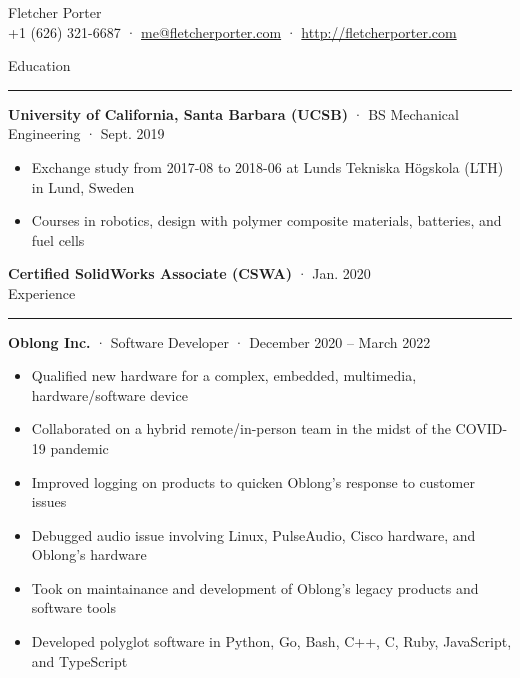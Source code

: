 \documentclass[12pt, oneside]{article}
\newcommand{\titlestyle}[1] {
	{\fontsize{40pt}{1em}\selectfont \textcolor{new_red}{\textsf{#1}}} \\
}
\newcommand{\headingstyleJobs}[1] {
	{\fontsize{18pt}{1em}\selectfont \textcolor{new_red}{\textsf{#1}}}
	\textcolor{new_red}{\rule{3.25in}{0.5pt}} \vspace{3pt}
}
\newcommand{\infostyle}[1] {
	{\selectfont #1} \\ \vspace{10pt}
}
\newcommand{\jobtitle}[3] {
	{\bf #1} · {#2} · {#3} \vspace{-7pt} \\
}
\newcommand{\certification}[2] {
	{\bf #1} · {#2} \vspace{5pt} \\
}
\begin{document}
\begin{flushleft}



\titlestyle{Fletcher Porter}
\infostyle{+1 (626) 321-6687 · \href{mailto:me@fletcherporter.com}{me@fletcherporter.com} · \url{http://fletcherporter.com}}


\headingstyleJobs{Education}

\jobtitle{University of California, Santa Barbara (UCSB)}{BS Mechanical Engineering}{Sept. 2019}
\begin{itemize}
	\item Exchange study from 2017-08 to 2018-06 at Lunds Tekniska Högskola (LTH) in Lund, Sweden \\
	\item Courses in robotics, design with polymer composite materials, batteries, and fuel cells
\end{itemize}


\certification{Certified SolidWorks Associate (CSWA)}{Jan. 2020}


\headingstyleJobs{Experience}

\jobtitle{Oblong Inc.}{Software Developer}{December 2020 – March 2022}
\begin{itemize}
	\item Qualified new hardware for a complex, embedded, multimedia, hardware/software device \\
	\item Collaborated on a hybrid remote/in-person team in the midst of the COVID-19 pandemic \\
	\item Improved logging on products to quicken Oblong's response to customer issues \\
	\item Debugged audio issue involving Linux, PulseAudio, Cisco hardware, and Oblong's hardware \\
	\item Took on maintainance and development of Oblong's legacy products and  software tools \\
	\item Developed polyglot software in Python, Go, Bash, C++, C, Ruby, JavaScript, and TypeScript \\
\end{itemize}


\end{flushleft}
\end{document}
